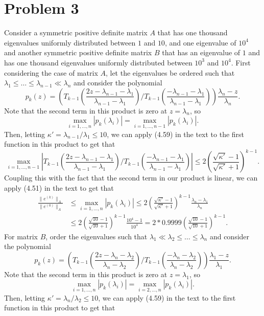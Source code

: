\documentclass{article}
\begin{document}
\section{Problem 3}
Consider a symmetric positive definite matrix $A$ that has one thousand eigenvalues
uniformly distributed between $1$ and $10$, and one eigenvalue of $10^4$ and another symmetric positive definite matrix $B$ that has an eigenvalue
of $1$ and has one thousand eigenvalues uniformly distributed between $10^3$ and $10^4$. First considering the case of matrix $A$, let the eigenvalues be ordered such that $\lambda_1\leq\ldots\leq\lambda_{n-1}\ll\lambda_n$ and consider the polynomial
\[
p_k(z)=\left(T_{k-1}\left(\frac{2z-\lambda_{n-1}-\lambda_1}{\lambda_{n-1}-\lambda_1}\right)\biggr/T_{k-1}\left(\frac{-\lambda_{n-1}-\lambda_1}{\lambda_{n-1}-\lambda_1}\right)\right)\frac{\lambda_n-z}{\lambda_n}.
\]
Note that the second term in this product is zero at $z=\lambda_n$, so 
\[
\max_{i=1,\ldots,n}|p_k(\lambda_i)|=\max_{i=1,\ldots,n-1}|p_k(\lambda_i)|.
\]
Then, letting $\kappa'=\lambda_{n-1}/\lambda_1\leq10$, we can apply (4.59) in the text to the first function in this product to get that
\[
\max_{i=1,\ldots,n-1}\left|T_{k-1}\left(\frac{2z-\lambda_{n-1}-\lambda_1}{\lambda_{n-1}-\lambda_1}\right)\biggr/T_{k-1}\left(\frac{-\lambda_{n-1}-\lambda_1}{\lambda_{n-1}-\lambda_1}\right)\right|\leq2\left(\frac{\sqrt{\kappa'}-1}{\sqrt{\kappa'}+1}\right)^{k-1}.
\]
Coupling this with the fact that the second term in our product is linear, we can apply (4.51) in the text to get that
\begin{align*}
\frac{\| e^{(k)} \|_{A}}{\| e^{(0)} \|_{A}}&\leq \max_{i=1,\ldots,n}|p_k(\lambda_i)|\leq2\left(\frac{\sqrt{\kappa'}-1}{\sqrt{\kappa'}+1}\right)^{k-1}\frac{\lambda_n-\lambda_1}{\lambda_n}\\&\leq
2\left(\frac{\sqrt{10}-1}{\sqrt{10}+1}\right)^{k-1}\frac{10^4-1}{10^4}=2*0.9999\left(\frac{\sqrt{10}-1}{\sqrt{10}+1}\right)^{k-1}.
\end{align*}
For matrix $B$, order the eigenvalues such that $\lambda_1\ll\lambda_2\leq\ldots\leq\lambda_n$ and consider the polynomial
\[
p_k(z)=\left(T_{k-1}\left(\frac{2z-\lambda_{n}-\lambda_2}{\lambda_{n}-\lambda_2}\right)\biggr/T_{k-1}\left(\frac{-\lambda_{n}-\lambda_2}{\lambda_{n}-\lambda_2}\right)\right)\frac{\lambda_1-z}{\lambda_1}.
\]
Note that the second term in this product is zero at $z=\lambda_1$, so 
\[
\max_{i=1,\ldots,n}|p_k(\lambda_i)|=\max_{i=2,\ldots,n}|p_k(\lambda_i)|.
\]
Then, letting $\kappa'=\lambda_{n}/\lambda_2\leq10$, we can apply (4.59) in the text to the first function in this product to get that
\end{document}
